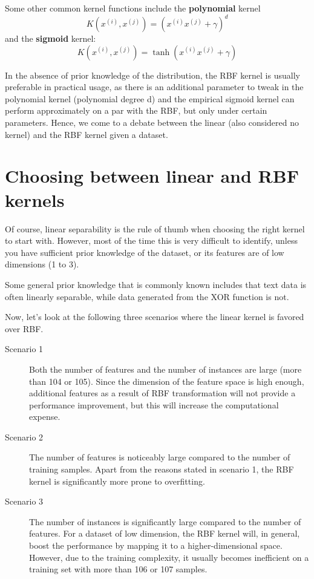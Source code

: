 Some other common kernel functions include the \textbf{polynomial} kernel
$$K(x^{(i)}, x^{(j)})=(x^{(i)}x^{(j)}+\gamma)^d$$
and the \textbf{sigmoid} kernel:
$$K(x^{(i)}, x^{(j)})=\tanh(x^{(i)}x^{(j)}+\gamma)$$

In the absence of prior knowledge of the distribution, the RBF kernel is usually preferable in practical usage, as there is an additional parameter to tweak in the polynomial kernel (polynomial degree d) and the empirical sigmoid kernel can perform approximately on a par with the RBF, but only under certain parameters. Hence, we come to a debate between the linear (also considered no kernel) and the RBF kernel given a dataset.

\section{Choosing between linear and RBF kernels}
Of course, linear separability is the rule of thumb when choosing the right kernel to start with. However, most of the time this is very difficult to identify, unless you have sufficient prior knowledge of the dataset, or its features are of low dimensions (1 to 3).

\begin{tcolorbox}
    Some general prior knowledge that is commonly known includes that text data is often linearly separable, while data generated from the XOR function is not.
\end{tcolorbox}

Now, let's look at the following three scenarios where the linear kernel is favored
over RBF.

\begin{description}
    \item[Scenario 1]Both the number of features and the number of instances are large (more than 104 or 105). Since the dimension of the feature space is high enough, additional features as a result of RBF transformation will not provide a performance improvement, but this will increase the computational expense.
    \item[Scenario 2]The number of features is noticeably large compared to the number of training samples. Apart from the reasons stated in scenario 1, the RBF kernel is significantly more prone to overfitting.
    \item[Scenario 3]The number of instances is significantly large compared to the number of features. For a dataset of low dimension, the RBF kernel will, in general, boost the performance by mapping it to a higher-dimensional space. However, due to the training complexity, it usually becomes inefficient on a training set with more than 106 or 107 samples.
\end{description}

